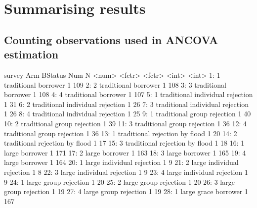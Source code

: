 


\section{Summarising results}


\subsection{Counting observations used in ANCOVA estimation}

\begin{Schunk}
\begin{Soutput}
    survey         Arm              BStatus   Num     N
     <num>      <fctr>               <fctr> <int> <int>
 1:      1 traditional             borrower     1   109
 2:      2 traditional             borrower     1   108
 3:      3 traditional             borrower     1   108
 4:      4 traditional             borrower     1   107
 5:      1 traditional individual rejection     1    31
 6:      2 traditional individual rejection     1    26
 7:      3 traditional individual rejection     1    26
 8:      4 traditional individual rejection     1    25
 9:      1 traditional      group rejection     1    40
10:      2 traditional      group rejection     1    39
11:      3 traditional      group rejection     1    36
12:      4 traditional      group rejection     1    36
13:      1 traditional   rejection by flood     1    20
14:      2 traditional   rejection by flood     1    17
15:      3 traditional   rejection by flood     1    18
16:      1       large             borrower     1   171
17:      2       large             borrower     1   163
18:      3       large             borrower     1   165
19:      4       large             borrower     1   164
20:      1       large individual rejection     1     9
21:      2       large individual rejection     1     8
22:      3       large individual rejection     1     9
23:      4       large individual rejection     1     9
24:      1       large      group rejection     1    20
25:      2       large      group rejection     1    20
26:      3       large      group rejection     1    19
27:      4       large      group rejection     1    19
28:      1 large grace             borrower     1   167

\end{Soutput}
\end{Schunk}

